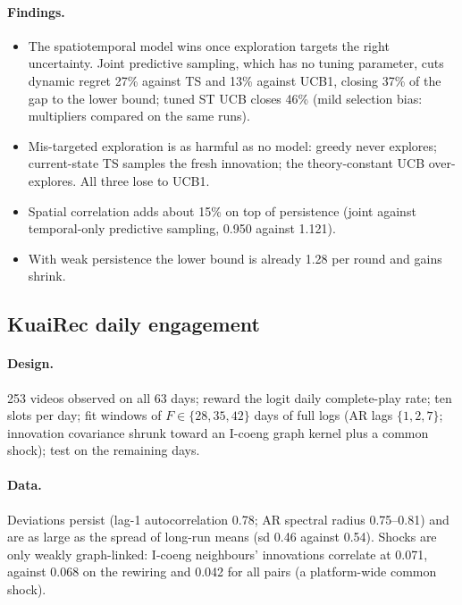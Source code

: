 \documentclass[11pt]{article}
\theoremstyle{definition}
\theoremstyle{remark}
\begin{document}
\paragraph{Findings.}
\begin{itemize}
\item The spatiotemporal model wins once exploration targets the right uncertainty. Joint predictive sampling, which has no tuning parameter, cuts dynamic regret 27\% against TS and 13\% against UCB1, closing 37\% of the gap to the lower bound; tuned ST UCB closes 46\% (mild selection bias: multipliers compared on the same runs).
\item Mis-targeted exploration is as harmful as no model: greedy never explores; current-state TS samples the fresh innovation; the theory-constant UCB over-explores. All three lose to UCB1.
\item Spatial correlation adds about 15\% on top of persistence (joint against temporal-only predictive sampling, 0.950 against 1.121).
\item With weak persistence the lower bound is already 1.28 per round and gains shrink.
\end{itemize}

\subsection{KuaiRec daily engagement}

\paragraph{Design.} 253 videos observed on all 63 days; reward the logit daily complete-play rate; ten slots per day; fit windows of $F\in\{28,35,42\}$ days of full logs (AR lags $\{1,2,7\}$; innovation covariance shrunk toward an I-coeng graph kernel plus a common shock); test on the remaining days.

\paragraph{Data.} Deviations persist (lag-1 autocorrelation 0.78; AR spectral radius 0.75--0.81) and are as large as the spread of long-run means (sd 0.46 against 0.54). Shocks are only weakly graph-linked: I-coeng neighbours' innovations correlate at 0.071, against 0.068 on the rewiring and 0.042 for all pairs (a platform-wide common shock).
\end{document}

